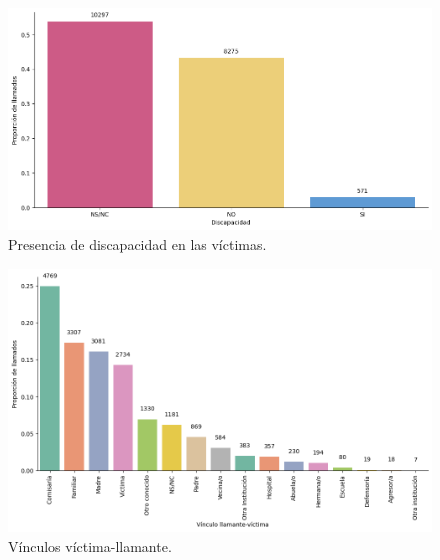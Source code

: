 \documentclass[10 pt]{article}
\begin{document}
\begin{figure}[H]
\begin{center}
\includegraphics[scale=.5]{images/latex_victima_discapacidad.png}
\caption{Presencia de discapacidad en las víctimas.}
\label{discapacidad}
\end{center}
\end{figure}



\begin{figure}[H]
\begin{center}
\includegraphics[scale=.5]{images/latex_vinculo_llamante.png}
\caption{Vínculos víctima-llamante.}
\label{vinculollamante}
\end{center}
\end{figure}
\end{document}
